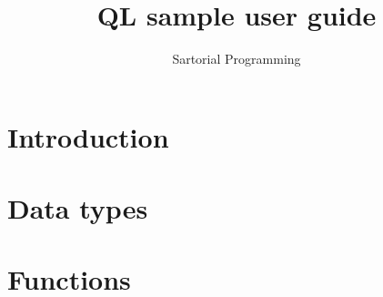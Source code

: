 \documentclass[a4paper] {report}
\author{Sartorial Programming}
\title{QL sample user guide}
\begin{document}
\maketitle
\tableofcontents

\newpage
\chapter{Introduction}



\chapter{Data types}


\chapter{Functions}

\end{document}
